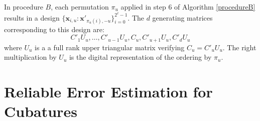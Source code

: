 \documentclass[]{elsarticle}
\theoremstyle{definition}
\newcommand{\bvec}[1]{\boldsymbol{#1}}
\newcommand{\vx}{\bvec{x}}
\begin{document}
In procedure $B$, each permutation $\pi_u$ applied in step $6$ of Algorithm \ref{procedureB} results in a design $\{\vx_{i,u}:{\vx'}_{\pi_u(i),-u}\}_{i=0}^{2^\ell-1}$. The $d$ generating matrices corresponding to this design are:
$${C'}_1U_u,\dots,{C'}_{u-1}U_u,C_u,{C'}_{u+1}U_u,{C'}_dU_u$$ where $U_u$ is a a full rank upper triangular matrix verifying $C_u={C'}_uU_u$. The right multiplication by $U_u$ is the digital representation of the ordering by $\pi_u$. 


\section{Reliable Error Estimation for Cubatures}
\label{section.error} 
\end{document}
